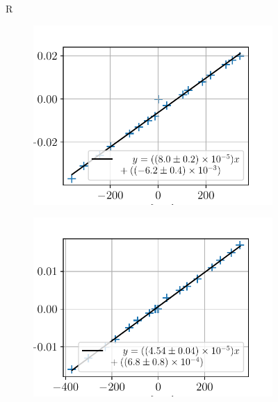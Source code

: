 \begin{figure}{R}
    \centering
    \begin{subfigure}{0.5\textwidth}
        \includegraphics[width=\linewidth]{figures/Ag_B.pdf}
        \caption{}
        \label{fig:Ag_B}
    \end{subfigure}%
    \begin{subfigure}{0.5\textwidth}
        \includegraphics[width=\linewidth]{figures/Cu_B.pdf}
        \caption{}
        \label{fig:Cu_B}
    \end{subfigure}%
    \begin{subfigure}{0.5\textwidth}

\end{subfigure}
\end{figure}

